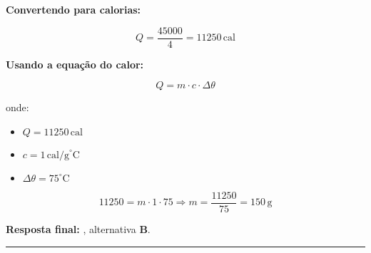 \documentclass[a4paper,12pt]{article}
\begin{document}
\begin{flushleft}
\textbf{Convertendo para calorias:}

\[
Q = \frac{45000}{4} = 11250\,\text{cal}
\]

\textbf{Usando a equação do calor:}

\[
Q = m \cdot c \cdot \Delta \theta
\]

onde:

\begin{itemize}
    \item $Q = 11250\,\text{cal}$
    \item $c = 1\,\text{cal/g}^\circ\text{C}$
    \item $\Delta \theta = 75^\circ\text{C}$
\end{itemize}

\[
11250 = m \cdot 1 \cdot 75 \Rightarrow m = \frac{11250}{75} = \boxed{150\,\text{g}}
\]

\vspace{0.3cm}
\textbf{Resposta final:} , alternativa \colorbox{green!50}{\textbf{B}}.

\end{flushleft}

\noindent\rule{\linewidth}{0.6pt}\\
\end{document}
